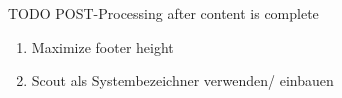 TODO POST-Processing after content is complete

\begin{enumerate}
    \item Maximize footer height
    \item Scout als Systembezeichner verwenden/ einbauen
\end{enumerate}